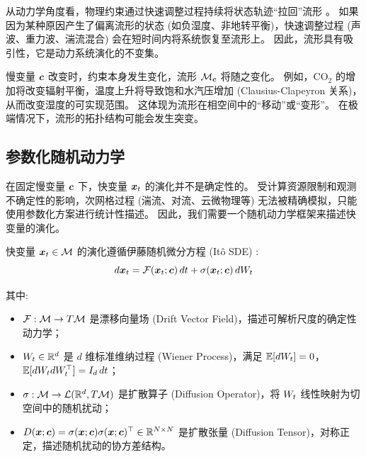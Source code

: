 从动力学角度看，物理约束通过快速调整过程持续将状态轨迹“拉回”流形 \cite{ghil2008climate}。
如果因为某种原因产生了偏离流形的状态 (如负湿度、非地转平衡)，快速调整过程 (声波、重力波、湍流混合) 会在短时间内将系统恢复至流形上。
因此，流形具有吸引性，它是动力系统演化的不变集。

慢变量 $\bm{c}$ 改变时，约束本身发生变化，流形 $\mathcal{M}_{\bm{c}}$ 将随之变化。
例如，$\text{CO}_2$ 的增加将改变辐射平衡，温度上升将导致饱和水汽压增加 (Clausius-Clapeyron 关系)，从而改变湿度的可实现范围。
这体现为流形在相空间中的“移动”或“变形”。
在极端情况下，流形的拓扑结构可能会发生突变。

\subsection{参数化随机动力学}
\label{sec:stochastic_dynamics}

在固定慢变量 $\bm{c}$ 下，快变量 $\bm{x}_t$ 的演化并不是确定性的。
受计算资源限制和观测不确定性的影响，次网格过程 (湍流、对流、云微物理等) 无法被精确模拟，只能使用参数化方案进行统计性描述。
因此，我们需要一个随机动力学框架来描述快变量的演化。

\begin{assumption}[参数化随机动力学]
\label{ass:stochastic_dynamics}
    快变量 $\bm{x}_t \in \mathcal{M}$ 的演化遵循伊藤随机微分方程 (Itô SDE) \cite{pavliotis2014stochastic}:
    \begin{equation}
    \label{eq:sde}
        d\bm{x}_t = \mathcal{F}(\bm{x}_t; \bm{c})\,dt + \sigma(\bm{x}_t; \bm{c})\,dW_t
    \end{equation}

    其中:
    \begin{itemize}
        \item $\mathcal{F}: \mathcal{M} \to T\mathcal{M}$ 是漂移向量场 (Drift Vector Field)，描述可解析尺度的确定性动力学；
        \item $W_t \in \mathbb{R}^d$ 是 $d$ 维标准维纳过程 (Wiener Process)，满足 $\mathbb{E}[dW_t] = 0$，$\mathbb{E}[dW_t dW_t^\top] = I_d\,dt$；
        \item $\sigma: \mathcal{M} \to \mathcal{L}(\mathbb{R}^d, T\mathcal{M})$ 是扩散算子 (Diffusion Operator)，将 $W_t$ 线性映射为切空间中的随机扰动；
        \item $D(\bm{x}; \bm{c}) = \sigma(\bm{x}; \bm{c})\sigma(\bm{x}; \bm{c})^\top \in \mathbb{R}^{N \times N}$ 是扩散张量 (Diffusion Tensor)，对称正定，描述随机扰动的协方差结构。
    \end{itemize}
\end{assumption}

